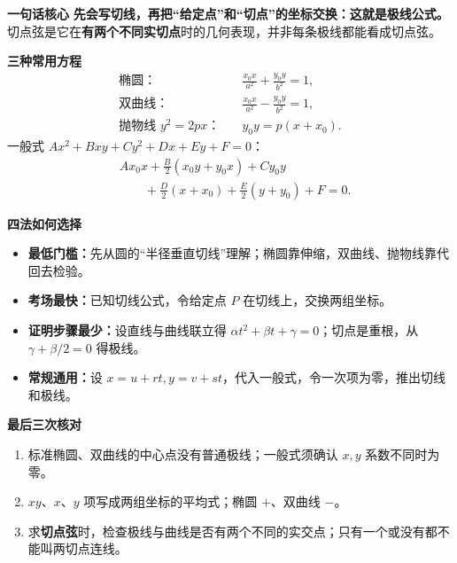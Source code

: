 \clearpage
\begin{summarybox}
\textbf{\textcolor{CSummary}{一句话核心}}
\textbf{先会写切线，再把“给定点”和“切点”的坐标交换：这就是极线公式。}
切点弦是它在\textbf{有两个不同实切点}时的几何表现，并非每条极线都能看成切点弦。

\medskip
\textbf{\textcolor{CSummary}{三种常用方程}}
\begin{align*}
 \text{椭圆：}&\quad\boxed{\frac{x_0x}{a^2}+\frac{y_0y}{b^2}=1},\\
 \text{双曲线：}&\quad\boxed{\frac{x_0x}{a^2}-\frac{y_0y}{b^2}=1},\\
 \text{抛物线 }y^2=2px\text{：}&\quad\boxed{y_0y=p(x+x_0)}.
\end{align*}
一般式 $Ax^2+Bxy+Cy^2+Dx+Ey+F=0$：
\[
 \boxed{\begin{aligned}
 &Ax_0x+\frac{B}{2}(x_0y+y_0x)+Cy_0y\\
 &\qquad+\frac{D}{2}(x+x_0)+\frac{E}{2}(y+y_0)+F=0.
 \end{aligned}}
\]

\medskip
\textbf{\textcolor{CSummary}{四法如何选择}}
\begin{itemize}[leftmargin=*,itemsep=0.3em]
 \item \textbf{最低门槛：}先从圆的“半径垂直切线”理解；椭圆靠伸缩，双曲线、抛物线靠代回去检验。
 \item \textbf{考场最快：}已知切线公式，令给定点 $P$ 在切线上，交换两组坐标。
 \item \textbf{证明步骤最少：}设直线与曲线联立得 $\alpha t^2+\beta t+\gamma=0$；切点是重根，从 $\gamma+\beta/2=0$ 得极线。
 \item \textbf{常规通用：}设 $x=u+rt,y=v+st$，代入一般式，令一次项为零，推出切线和极线。
\end{itemize}

\medskip
\textbf{\textcolor{CSummary}{最后三次核对}}
\begin{enumerate}[leftmargin=*,itemsep=0.25em]
 \item 标准椭圆、双曲线的中心点没有普通极线；一般式须确认 $x,y$ 系数不同时为零。
 \item $xy$、$x$、$y$ 项写成两组坐标的平均式；椭圆 $+$、双曲线 $-$。
 \item 求\textbf{切点弦}时，检查极线与曲线是否有两个不同的实交点；只有一个或没有都不能叫两切点连线。
\end{enumerate}
\end{summarybox}
